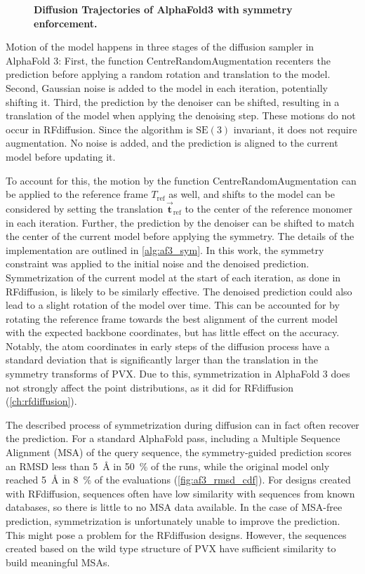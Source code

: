 \begin{figure}[!htb]

\caption{\textbf{Diffusion Trajectories of AlphaFold3 with symmetry enforcement. }}
\label{fig:af3_sym_traj}
\end{figure}

Motion of the model happens in three stages of the diffusion sampler in AlphaFold 3: First, the function CentreRandomAugmentation recenters the prediction before applying a random rotation and translation to the model. Second, Gaussian noise is added to the model in each iteration, potentially shifting it. Third, the prediction by the denoiser can be shifted, resulting in a translation of the model when applying the denoising step. These motions do not occur in RFdiffusion. Since the algorithm is $\mathrm{SE}(3)$ invariant, it does not require augmentation. No noise is added, and the prediction is aligned to the current model before updating it. 


To account for this, the motion by the function CentreRandomAugmentation can be applied to the reference frame $T_\text{ref}$ as well, and shifts to the model can be considered by setting the translation $\vec{\mathbf{t}}_{\text{ref}}$ to the center of the reference monomer in each iteration. Further, the prediction by the denoiser can be shifted to match the center of the current model before applying the symmetry. The details of the implementation are outlined in \autoref{alg:af3_sym}. In this work, the symmetry constraint was applied to the initial noise and the denoised prediction. Symmetrization of the current model at the start of each iteration, as done in RFdiffusion, is likely to be similarly effective. The denoised prediction could also lead to a slight rotation of the model over time. This can be accounted for by rotating the reference frame towards the best alignment of the current model with the expected backbone coordinates, but has little effect on the accuracy. Notably, the atom coordinates in early steps of the diffusion process have a standard deviation that is significantly larger than the translation in the symmetry transforms of PVX. Due to this, symmetrization in AlphaFold 3 does not strongly affect the point distributions, as it did for RFdiffusion (\autoref{ch:rfdiffusion}).

The described process of symmetrization during diffusion can in fact often recover the prediction. For a standard AlphaFold pass, including a Multiple Sequence Alignment (MSA) of the query sequence, the symmetry-guided prediction scores an RMSD less than \SI{5}{\angstrom} in \SI{50}{\percent} of the runs, while the original model only reached \SI{5}{\angstrom} in \SI{8}{\percent} of the evaluations (\autoref{fig:af3_rmsd_cdf}). For designs created with RFdiffusion, sequences often have low similarity with sequences from known databases, so there is little to no MSA data available. In the case of MSA-free prediction, symmetrization is unfortunately unable to improve the prediction. This might pose a problem for the RFdiffusion designs. However, the sequences created based on the wild type structure of PVX have sufficient similarity to build meaningful MSAs. 

